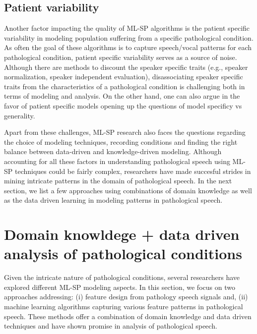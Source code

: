 \documentclass{article}
\begin{document}
\subsection{Patient variability}
\label{sed:PatVar}
Another factor impacting the quality of ML-SP algorithms is the patient specific variability in modeling population suffering from a specific pathological condition. 
As often the goal of these algorithms is to capture speech/vocal patterns for each pathological condition, patient specific variability serves as a source of noise.
Although there are methods to discount the speaker specific traits (e.g., speaker normalization, speaker independent evaluation), disassociating speaker specific traits\cite{berisha2013selecting} from the characteristics of a pathological condition is challenging both in terms of modeling and analysis. 
On the other hand, one can also argue in the favor of patient specific models opening up the questions of model specificy vs generality. 

Apart from these challenges, ML-SP research also faces the questions regarding the choice of modeling techniques, recording conditions and finding the right balance between data-driven and knowledge-driven modeling. 
Although accounting for all these factors in understanding pathological speech using ML-SP techniques could be fairly complex, researchers have made succesful strides in mining intricate patterns in the domain of pathological speech.
In the next section, we list a few approaches using combinations of domain knowledge as well as the data driven learning in modeling patterns in pathological speech. 

\section{Domain knowldege + data driven analysis of pathological conditions}
Given the intricate nature of pathological conditions, several researchers have explored different ML-SP modeling aspects. 
In this section, we focus on two approaches addressing: (i) feature design from pathology speech signals and, (ii) machine learning algorithms capturing various feature patterns in pathological speech.
These methods offer a combination of domain knowledge and data driven techniques and have shown promise in analysis of pathological speech.
 
\end{document}
